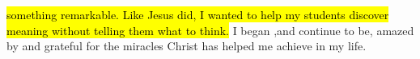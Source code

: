 \documentclass{article}%
\begin{document}
\hl{something remarkable.   Like Jesus did, I wanted to help my students discover meaning without telling them what to think.} %
I began ,and continue to be, amazed by and grateful for the miracles Christ has helped me achieve in my life. 


\end{document}
